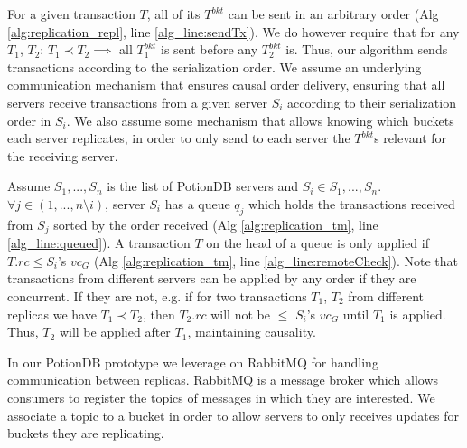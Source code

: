 \documentclass[sigplan,10pt]{acmart}
\begin{document}
For a given transaction $T$, all of its $T^{bkt}$ can be sent in an arbitrary order (Alg \ref{alg:replication_repl}, line \ref{alg_line:sendTx}).
We do however require that for any $T_1$, $T_2$: $T_1 \prec T_2 \implies$ all $T_1^{bkt}$ is sent before any $T_2^{bkt}$ is.
Thus, our algorithm sends transactions according to the serialization order.
We assume an underlying communication mechanism that ensures causal order delivery, ensuring that all servers receive transactions from a given server $S_i$ according to their serialization order in $S_i$.
We also assume some mechanism that allows knowing which buckets each server replicates, in order to only send to each server the $T^{bkt}$s relevant for the receiving server.

Assume $S_1, ..., S_n$ is the list of PotionDB servers and $S_i \in S_1, ..., S_n$.
$\forall j \in (1, ..., n \setminus i)$, server $S_i$ has a queue $q_j$ which holds the transactions received from $S_j$ sorted by the order received (Alg \ref{alg:replication_tm}, line \ref{alg_line:queued}).
A transaction $T$ on the head of a queue is only applied if $T.rc \leq S_i$'s $vc_G$ (Alg \ref{alg:replication_tm}, line \ref{alg_line:remoteCheck}).
Note that transactions from different servers can be applied by any order if they are concurrent. 
If they are not, e.g. if for two transactions $T_1$, $T_2$ from different replicas we have $T_1 \prec T_2$, then $T_2.rc$ will not be $\leq$ $S_i$'s $vc_G$ until $T_1$ is applied.
Thus, $T_2$ will be applied after $T_1$, maintaining causality. %

In our PotionDB prototype we leverage on RabbitMQ \cite{rabbitmq} for handling communication between replicas.
RabbitMQ is a message broker which allows consumers to register the topics of messages in which they are interested.
We associate a topic to a bucket in order to allow servers to only receives updates for buckets they are replicating.
\end{document}
